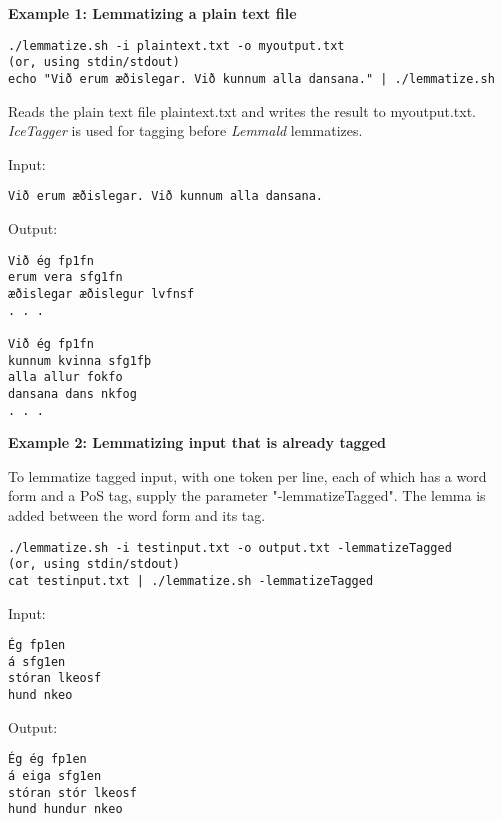 \documentclass[11pt]{article}
\begin{document}
\textbf{Example 1: Lemmatizing a plain text file}

\begin{verbatim}
./lemmatize.sh -i plaintext.txt -o myoutput.txt
(or, using stdin/stdout)
echo "Við erum æðislegar. Við kunnum alla dansana." | ./lemmatize.sh
\end{verbatim}

Reads the plain text file plaintext.txt and writes the result to myoutput.txt. \textit{IceTagger} is used for tagging
before \textit{Lemmald} lemmatizes.

Input:
\begin{verbatim}
Við erum æðislegar. Við kunnum alla dansana. 
\end{verbatim}

Output:
\begin{verbatim}
Við ég fp1fn
erum vera sfg1fn
æðislegar æðislegur lvfnsf
. . .

Við ég fp1fn
kunnum kvinna sfg1fþ
alla allur fokfo
dansana dans nkfog
. . .
\end{verbatim}

\textbf{Example 2: Lemmatizing input that is already tagged}

To lemmatize tagged input, with one token per line, each of which has a word form and a PoS tag, supply the parameter "-lemmatizeTagged".
The lemma is added between the word form and its tag.

\begin{verbatim}
./lemmatize.sh -i testinput.txt -o output.txt -lemmatizeTagged
(or, using stdin/stdout)
cat testinput.txt | ./lemmatize.sh -lemmatizeTagged 
\end{verbatim}

Input:
\begin{verbatim}
Ég fp1en
á sfg1en
stóran lkeosf
hund nkeo 
\end{verbatim}

Output:
\begin{verbatim}
Ég ég fp1en
á eiga sfg1en
stóran stór lkeosf
hund hundur nkeo 
\end{verbatim}
\end{document}
